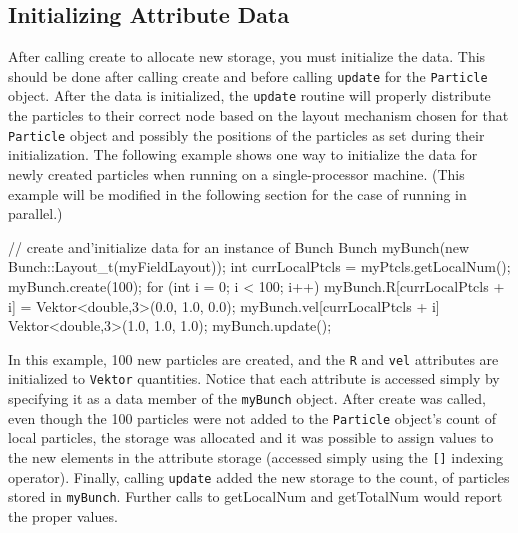 \subsection{Initializing Attribute Data}

After calling create to allocate new storage, you must initialize the data. This should be done after calling create and before calling \texttt{update} for the \texttt{Particle} object. After the data is initialized, the \texttt{update} routine will properly distribute the particles to their correct node based on the layout mechanism chosen for that \texttt{Particle} object and possibly the positions of the particles as set during their initialization. The following example shows one way to initialize the data for newly
created particles when running on a single-processor machine. (This example will be modified in the following section for the case of running in parallel.) \\
\begin{code}
// create and'initialize data for an instance of Bunch
Bunch myBunch(new Bunch::Layout\_t(myFieldLayout));
int currLocalPtcls = myPtcls.getLocalNum();
myBunch.create(100);
for (int i = 0; i < 100; i++) {
    myBunch.R[currLocalPtcls + i] = Vektor<double,3>(0.0, 1.0, 0.0);
    myBunch.vel[currLocalPtcls + i] Vektor<double,3>(1.0, 1.0, 1.0);
}
myBunch.update();
\end{code}


In this example, 100 new particles are created, and the \texttt{R} and \texttt{vel} attributes are initialized to \texttt{Vektor} quantities. Notice that each attribute is accessed simply by specifying it as a data member of the \texttt{myBunch} object. After create was called, even though the 100 particles were not added to the \texttt{Particle} object's count of local particles, the storage was allocated and it was possible to assign values to the new elements in the attribute storage
(accessed simply using the \texttt{[]} indexing operator). Finally, calling \texttt{update} added the new storage to the count, of particles stored in \texttt{myBunch}. Further calls to getLocalNum and getTotalNum would report the proper values.

\subsection{}


